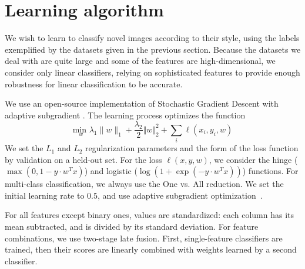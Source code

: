 
\section{Learning algorithm}

We wish to learn to classify novel images according to their style, using the labels exemplified by the datasets given in the previous section.
Because the datasets we deal with are quite large and some of the features are high-dimensional, we consider only linear classifiers, relying on sophisticated features to provide enough robustness for linear classification to be accurate.

We use an open-source implementation of Stochastic Gradient Descent with adaptive subgradient \cite{Agarwal-JMLR-2012}.
The learning process optimizes the function \[
\underset{w}{\text{min }} \lambda_1 \|w\|_1 + \frac{\lambda_2}{2} \Vert w \Vert_2^2 + \sum_i \ell(x_i, y_i, w)
\]
We set the $L_1$ and $L_2$ regularization parameters and the form of the loss function by validation on a held-out set.
For the loss $\ell(x, y, w)$, we consider the hinge ($\max(0, 1 - y \cdot w^T x)$) and logistic ($\log(1 + \exp(-y \cdot w^T x))$) functions.
For multi-class classification, we always use the One vs. All reduction.
We set the initial learning rate to $0.5$, and use adaptive subgradient optimization~\cite{duchi2011adaptive}.

For all features except binary ones, values are standardized: each column has its mean subtracted, and is divided by its standard deviation.
For feature combinations, we use two-stage late fusion.
First, single-feature classifiers are trained, then their scores are linearly combined with weights learned by a second classifier.
